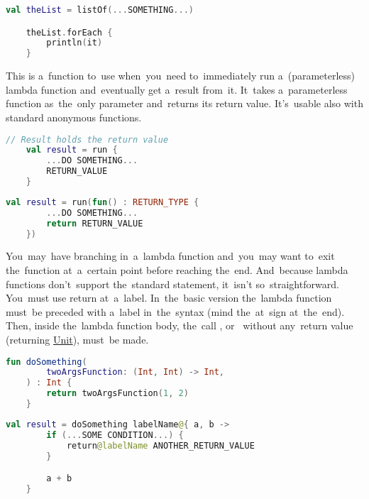 \begin{lstlisting}[language=Kotlin]
    val theList = listOf(...SOMETHING...)

    theList.forEach {
        println(it)
    }
\end{lstlisting}

\label{kotlinrun}
This is a~function to~use when~you~need to~immediately run a~(parameterless) lambda function and~eventually get a~result from~it.
It~takes a~parameterless function as~the~only parameter and~returns its return value.
It's~usable also with standard anonymous functions.

\begin{lstlisting}[language=Kotlin, title={\textit{Run} with lambda function}]
    // Result holds the return value
    val result = run {
        ...DO SOMETHING...
        RETURN_VALUE
    }
\end{lstlisting}
\begin{lstlisting}[language=Kotlin, title={Equivalent with standard anonymous function}]
    val result = run(fun() : RETURN_TYPE {
        ...DO SOMETHING...
        return RETURN_VALUE
    })
\end{lstlisting}

You~may~have  branching in~a~lambda function and~you~may want to~exit the~function at~a~certain point before reaching the~end.
And~because lambda functions don't~support the~standard  statement, it~isn't so~straightforward.
You~must use return at~a~label.
In~the~basic version the~lambda function must~be preceded with a~label in~the~syntax  (mind the~at~sign at~the~end).
Then, inside the~lambda function body, the~call , \mbox{or } without any~return value (returning \hyperref[kotlinunit]{Unit}), must~be made.

\begin{lstlisting}[language=Kotlin, title={Function taking other function as the~only parameter}]
    fun doSomething(
        twoArgsFunction: (Int, Int) -> Int,
    ) : Int {
        return twoArgsFunction(1, 2)
    }
\end{lstlisting}
\begin{lstlisting}[language=Kotlin, title={Usage}]
    val result = doSomething labelName@{ a, b ->
        if (...SOME CONDITION...) {
            return@labelName ANOTHER_RETURN_VALUE
        }

        a + b
    }
\end{lstlisting}
\newline

